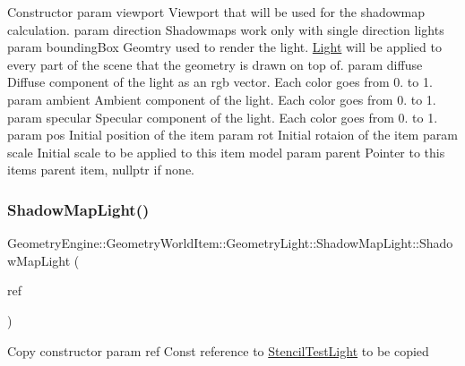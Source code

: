Constructor param viewport Viewport that will be used for the shadowmap calculation. param direction Shadowmaps work only with single direction lights param bounding\+Box Geomtry used to render the light. \mbox{\hyperlink{class_geometry_engine_1_1_geometry_world_item_1_1_geometry_light_1_1_light}{Light}} will be applied to every part of the scene that the geometry is drawn on top of. param diffuse Diffuse component of the light as an rgb vector. Each color goes from 0. to 1. param ambient Ambient component of the light. Each color goes from 0. to 1. param specular Specular component of the light. Each color goes from 0. to 1. param pos Initial position of the item param rot Initial rotaion of the item param scale Initial scale to be applied to this item model param parent Pointer to this items parent item, nullptr if none. \mbox{\label{class_geometry_engine_1_1_geometry_world_item_1_1_geometry_light_1_1_shadow_map_light_a2879b30ef1f4ff318fd55f600001f70f}} 
\subsubsection{\texorpdfstring{ShadowMapLight()}{ShadowMapLight()}\hspace{0.1cm}{\footnotesize\ttfamily [2/2]}}
{\footnotesize\ttfamily Geometry\+Engine\+::\+Geometry\+World\+Item\+::\+Geometry\+Light\+::\+Shadow\+Map\+Light\+::\+Shadow\+Map\+Light (\begin{DoxyParamCaption}\item[{const \mbox{\hyperlink{class_geometry_engine_1_1_geometry_world_item_1_1_geometry_light_1_1_shadow_map_light}{Shadow\+Map\+Light}} \&}]{ref }\end{DoxyParamCaption})\hspace{0.3cm}{\ttfamily [inline]}}

Copy constructor param ref Const reference to \mbox{\hyperlink{class_geometry_engine_1_1_geometry_world_item_1_1_geometry_light_1_1_stencil_test_light}{Stencil\+Test\+Light}} to be copied 

